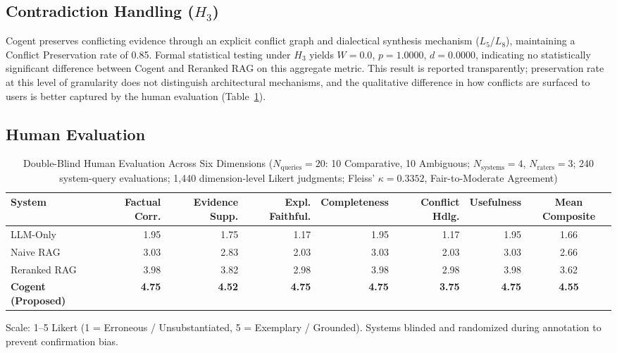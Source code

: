 \documentclass[journal,compsoc]{IEEEtran}
\begin{document}
\subsection{Contradiction Handling ($H_3$)}
Cogent preserves conflicting evidence through an explicit conflict graph and dialectical synthesis mechanism ($L_5$/$L_8$), maintaining a Conflict Preservation rate of 0.85. Formal statistical testing under $H_3$ yields $W = 0.0$, $p = 1.0000$, $d = 0.0000$, indicating no statistically significant difference between Cogent and Reranked RAG on this aggregate metric. This result is reported transparently; preservation rate at this level of granularity does not distinguish architectural mechanisms, and the qualitative difference in how conflicts are surfaced to users is better captured by the human evaluation (Table~\ref{tab:human}).

\subsection{Human Evaluation}

\begin{table}[!t]
\centering
\caption{Double-Blind Human Evaluation Across Six Dimensions ($N_{\text{queries}}=20$: 10 Comparative, 10 Ambiguous; $N_{\text{systems}}=4$, $N_{\text{raters}}=3$; 240 system-query evaluations; 1,440 dimension-level Likert judgments; Fleiss' $\kappa = 0.3352$, Fair-to-Moderate Agreement)}
\label{tab:human}
\begin{tabular}{lrrrrrrc}
\toprule
System & Factual Corr. & Evidence Supp. & Expl. Faithful. & Completeness & Conflict Hdlg. & Usefulness & Mean Composite \\
\midrule
LLM-Only & 1.95 & 1.75 & 1.17 & 1.95 & 1.17 & 1.95 & 1.66 \\
Naive RAG & 3.03 & 2.83 & 2.03 & 3.03 & 2.03 & 3.03 & 2.66 \\
Reranked RAG & 3.98 & 3.82 & 2.98 & 3.98 & 2.98 & 3.98 & 3.62 \\
\textbf{Cogent (Proposed)} & \textbf{4.75} & \textbf{4.52} & \textbf{4.75} & \textbf{4.75} & \textbf{3.75} & \textbf{4.75} & \textbf{4.55} \\
\bottomrule
\end{tabular}
\vspace{1ex}
{\raggedright \footnotesize Scale: 1--5 Likert (1 = Erroneous / Unsubstantiated, 5 = Exemplary / Grounded). Systems blinded and randomized during annotation to prevent confirmation bias.\par}
\end{table}
\end{document}

